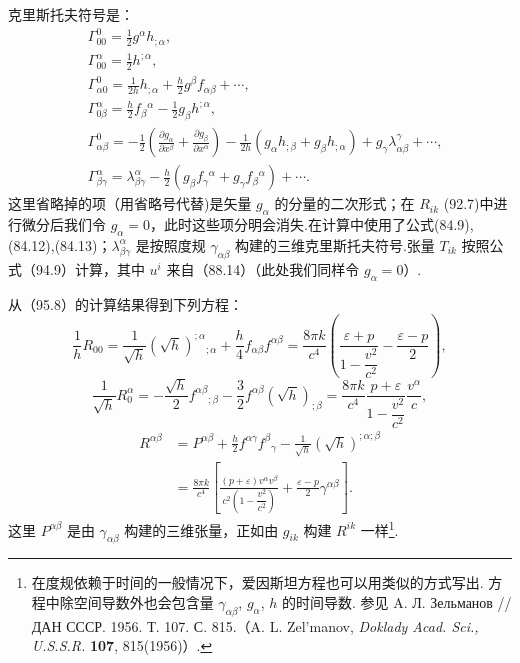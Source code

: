 \begin{xiti}
克里斯托夫符号是：
\begin{equation*}
\begin{aligned}
  &\Gamma^0_{00}=\frac{1}{2}g^{\alpha}h_{;\alpha},\\
  &\Gamma^{\alpha}_{00}=\frac{1}{2}h^{;\alpha},\\
  &\Gamma^0_{\alpha 0}=\frac{1}{2h}h_{;\alpha}
  +\frac{h}{2}g^{\beta}f_{\alpha\beta}+\cdots,\\
  &\Gamma^{\alpha}_{0\beta}=\frac{h}{2}f_{\beta}{}^{\alpha}
  -\frac{1}{2}g_{\beta}h^{;\alpha},\\
  &\Gamma^0_{\alpha\beta}
  =-\frac{1}{2}\left(\frac{\partial g_{\alpha}}{\partial x^{\beta}}
  +\frac{\partial g_{\beta}}{\partial x^{\alpha}}\right)
  -\frac{1}{2h}\left(g_{\alpha}h_{;\beta}+g_{\beta}h_{;\alpha}\right)
  +g_{\gamma}\lambda^{\gamma}_{\alpha\beta}+\cdots,\\
  &\Gamma^{\alpha}_{\beta\gamma}
  =\lambda^{\alpha}_{\beta\gamma}
  -\frac{h}{2}\left(g_{\beta}f_{\gamma}{}^{\alpha}
  +g_{\gamma}f_{\beta}{}^{\alpha}\right)+\cdots.
\end{aligned}
\end{equation*}
这里省略掉的项（用省略号代替)是矢量 $g_{\alpha}$ 的分量的二次形式；在 $R_{ik}$ (92.7)中进行微分后我们令 $g_{\alpha}=0$，此时这些项分明会消失.在计算中使用了公式(84.9),(84.12),(84.13)；$\lambda^{\alpha}_{\beta\gamma}$ 是按照度规 $\gamma_{\alpha\beta}$ 构建的三维克里斯托夫符号.张量 $T_{ik}$ 按照公式（94.9）计算，其中 $u^i$ 来自（88.14）（此处我们同样令 $g_{\alpha}=0$）.

从（95.8）的计算结果得到下列方程：
\begin{equation*}
  \frac{1}{h}R_{00}
  =\frac{1}{\sqrt{h}}(\sqrt{h})^{;\alpha}{}_{;\alpha}
  +\frac{h}{4}f_{\alpha\beta}f^{\alpha\beta}
  =\frac{8\pi k}{c^4}\left(
  \frac{\varepsilon+p}{1-\dfrac{v^2}{c^2}}-\frac{\varepsilon-p}{2}\right),
\tag{3}\end{equation*}
\begin{equation*}
  \frac{1}{\sqrt{h}}R^{\alpha}_0
  =-\frac{\sqrt{h}}{2}f^{\alpha\beta}{}_{;\beta}
  -\frac{3}{2}f^{\alpha\beta}(\sqrt{h})_{;\beta}
  =\frac{8\pi k}{c^4}\frac{p+\varepsilon}{1-\dfrac{v^2}{c^2}}
  \frac{v^{\alpha}}{c},
\tag{4}\end{equation*}
\begin{equation*}
\begin{aligned}
  R^{\alpha\beta}&=P^{\alpha\beta}
  +\frac{h}{2}f^{\alpha\gamma}f^{\beta}{}_{\gamma}
  -\frac{1}{\sqrt{h}}(\sqrt{h})^{;\alpha;\beta}\\
  &=\frac{8\pi k}{c^4}\left[
  \frac{(p+\varepsilon)v^{\alpha}v^{\beta}}
  {c^2\left(1-\dfrac{v^2}{c^2}\right)}
  +\frac{\varepsilon-p}{2}\gamma^{\alpha\beta}\right].
\end{aligned}
\tag{5}\end{equation*}
这里 $P^{\alpha\beta}$ 是由 $\gamma_{\alpha\beta}$ 构建的三维张量，正如由 $g_{ik}$ 构建 $R^{ik}$ 一样\footnote{在度规依赖于时间的一般情况下，爱因斯坦方程也可以用类似的方式写出. 方程中除空间导数外也会包含量 $\gamma_{\alpha\beta}$, $g_{\alpha}$, $h$ 的时间导数. 参见 A. Л. Зельманов // ДАН СССР. 1956. Т. 107. С. 815.（A. L. Zel'manov, \textit{Doklady Acad. Sci., U.S.S.R.} \textbf{107}, 815(1956)）.}.


\end{xiti}
